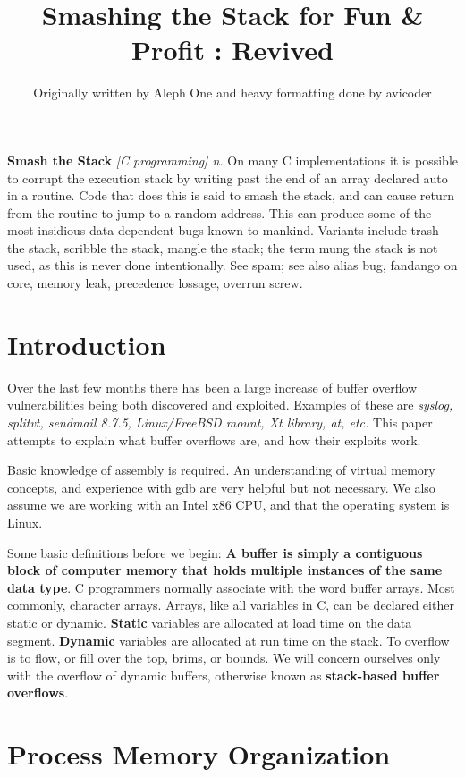 \documentclass[a4paper]{article}
\title{Smashing the Stack for Fun \& Profit : Revived}
\author{Originally written by Aleph One and heavy formatting done by avicoder}
\begin{document}
\maketitle

\textbf{Smash the Stack} \textit{[C programming] n.} On many C implementations it is possible to corrupt the execution stack by writing past the end of an array declared auto in a routine. Code that does this is said to smash the stack, and can cause return from the routine to jump to a random address. This can produce some of the most insidious data-dependent bugs known to mankind. Variants include trash the stack, scribble the stack, mangle the stack; the term mung the stack is not used, as this is never done intentionally. See spam; see also alias bug, fandango on core, memory leak, precedence lossage, overrun screw.

\section{Introduction}

Over the last few months there has been a large increase of buffer overflow vulnerabilities being both discovered and exploited. Examples of these are \textit{syslog, splitvt, sendmail 8.7.5, Linux/FreeBSD mount, Xt library, at, etc.} This paper attempts to explain what buffer overflows are, and how their exploits work.


Basic knowledge of assembly is required. An understanding of virtual memory concepts, and experience with gdb are very helpful but not necessary. We also assume we are working with an Intel x86 CPU, and that the operating system is Linux.


Some basic definitions before we begin: \textbf{A buffer is simply a contiguous block of computer memory that holds multiple instances of the same data type}. C programmers normally associate with the word buffer arrays. Most commonly, character arrays. Arrays, like all variables in C, can be declared either static or dynamic. \textbf{Static} variables are allocated at load time on the data segment. \textbf{Dynamic} variables are allocated at run time on the stack. To overflow is to flow, or fill over the top, brims, or bounds. We will concern ourselves only with the overflow of dynamic buffers, otherwise known as \textbf{stack-based buffer overflows}.

\section{Process Memory Organization}
\end{document}
